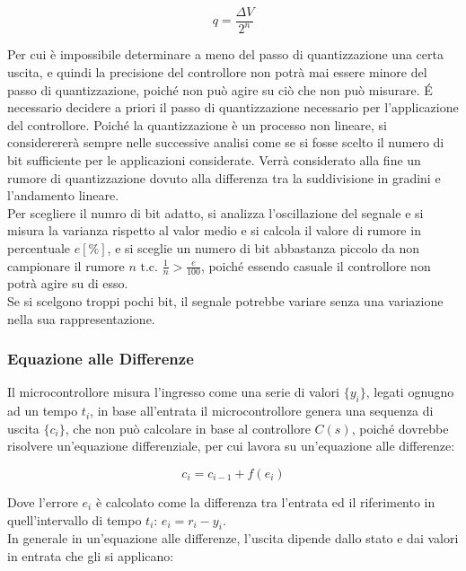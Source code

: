 \documentclass{article}
\numberwithin{equation}{subsection}
\begin{document}
\begin{equation}
    q=\displaystyle\frac{\Delta V}{2^n}
\end{equation}

Per cui è impossibile determinare a meno del passo di quantizzazione una certa uscita, e quindi la precisione del controllore non potrà mai essere minore del passo di 
quantizzazione, poiché non può agire su ciò che non può misurare. \'{E} necessario decidere a priori il passo di quantizzazione necessario per l'applicazione del controllore. 
Poiché la quantizzazione è un processo non lineare, si considerererà sempre nelle successive analisi come se si fosse scelto il numero di bit sufficiente per le applicazioni 
considerate. Verrà considerato alla fine un rumore di quantizzazione dovuto alla differenza tra la suddivisione in gradini e l'andamento lineare. \\

Per scegliere il numro di bit adatto, si analizza l'oscillazione del segnale e si misura la varianza rispetto al valor medio e si calcola il valore di rumore in percentuale 
$e[\%]$, e si sceglie un numero di bit abbastanza piccolo da non campionare il rumore $n\mbox{ t.c. }\displaystyle\frac{1}{n}>\frac{e}{100}$, poiché essendo casuale il 
controllore non potrà agire su di esso. \\

Se si scelgono troppi pochi bit, il segnale potrebbe variare senza una variazione nella sua rappresentazione. 

\subsubsection{Equazione alle Differenze}

Il microcontrollore misura l'ingresso come una serie di valori $\{y_i\}$, legati ognugno ad un tempo $t_i$, in base all'entrata il microcontrollore genera una sequenza di 
uscita $\{c_i\}$, che non può calcolare in base al controllore $C(s)$, poiché dovrebbe risolvere un'equazione differenziale, per cui lavora su un'equazione alle differenze: 

\begin{equation}
    c_i=c_{i-1}+f(e_i)
\end{equation}

Dove l'errore $e_i$ è calcolato come la differenza tra l'entrata ed il riferimento in quell'intervallo di tempo $t_i$: $e_i=r_i-y_i$. \\

In generale in un'equazione alle differenze, l'uscita dipende dallo stato e dai valori in entrata che gli si applicano: 
\end{document}
